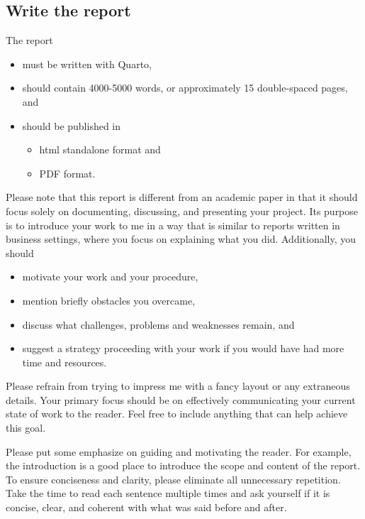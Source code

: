 \documentclass[
  a4paper,
  onecolumn,
  oneside]{scrartcl}
\providecommand{\tightlist}{%
  \setlength{\itemsep}{0pt}\setlength{\parskip}{0pt}}\usepackage{longtable,booktabs,array}
\begin{document}
\subsection{Write the report}\label{write-the-report}

The report

\begin{itemize}
\tightlist
\item
  must be written with Quarto,
\item
  should contain 4000-5000 words, or approximately 15 double-spaced
  pages, and
\item
  should be published in

  \begin{itemize}
  \tightlist
  \item
    html standalone format and
  \item
    PDF format.
  \end{itemize}
\end{itemize}

Please note that this report is different from an academic paper in that
it should focus solely on documenting, discussing, and presenting your
project. Its purpose is to introduce your work to me in a way that is
similar to reports written in business settings, where you focus on
explaining what you did. Additionally, you should

\begin{itemize}
\tightlist
\item
  motivate your work and your procedure,
\item
  mention briefly obstacles you overcame,
\item
  discuss what challenges, problems and weaknesses remain, and
\item
  suggest a strategy proceeding with your work if you would have had
  more time and resources.
\end{itemize}

Please refrain from trying to impress me with a fancy layout or any
extraneous details. Your primary focus should be on effectively
communicating your current state of work to the reader. Feel free to
include anything that can help achieve this goal.

Please put some emphasize on guiding and motivating the reader. For
example, the introduction is a good place to introduce the scope and
content of the report. To ensure conciseness and clarity, please
eliminate all unnecessary repetition. Take the time to read each
sentence multiple times and ask yourself if it is concise, clear, and
coherent with what was said before and after.
\end{document}

